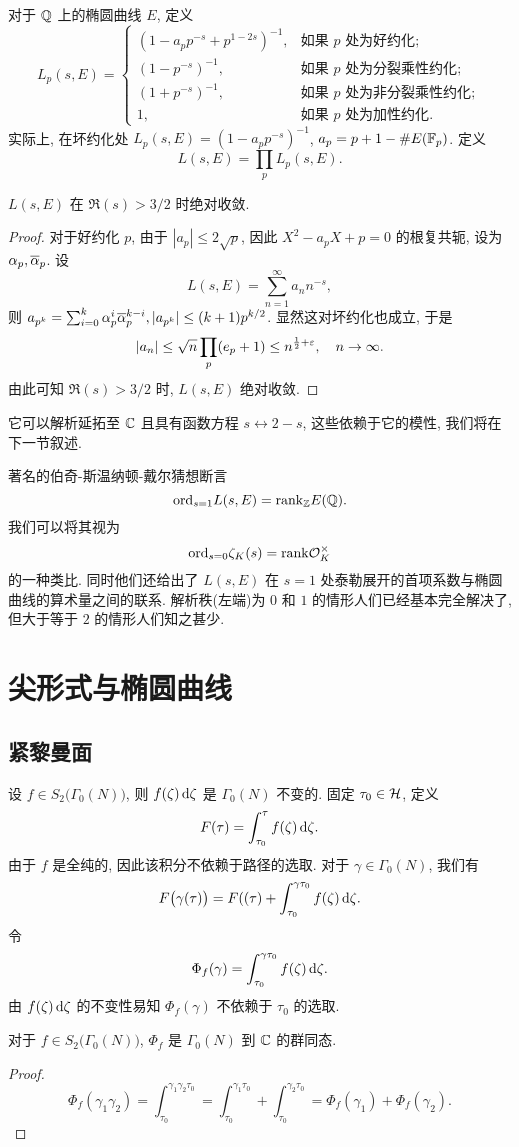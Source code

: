 对于 ${\mathbb{Q}}$ 上的椭圆曲线 $E$, 定义
  \[L_p(s,E)=\begin{cases}
    (1-a_p p^{-s}+p^{1-2s})^{-1}, & \text{如果 $p$ 处为好约化};\\
    (1-p^{-s})^{-1},              & \text{如果 $p$ 处为分裂乘性约化};\\
    (1+p^{-s})^{-1},              & \text{如果 $p$ 处为非分裂乘性约化};\\
    1,                            & \text{如果 $p$ 处为加性约化}.
  \end{cases}\]
实际上, 在坏约化处 $L_p(s,E)=(1-a_p p^{-s})^{-1}$, $a_p=p+1-\#E({\mathbb{F}}_p)$.
定义
  \[L(s,E)=\prod_{p} L_p(s,E).\]
\begin{proposition}{}{}
$L(s,E)$ 在 $\Re(s)>3/2$ 时绝对收敛.
\end{proposition}
\begin{proof}
对于好约化 $p$, 由于 $|a_p|\le 2\sqrt{p}$, 因此 $X^2-a_pX+p=0$ 的根复共轭, 设为 $\alpha_p,\overline \alpha_p$. 设
  \[L(s,E)=\sum_{n=1}^\infty a_n n^{-s},\]
则 $a_{p^k}=\sum_{i=0}^k \alpha_p^i\overline\alpha_p^{k-i}, |a_{p^k}|\le (k+1)p^{k/2}$. 显然这对坏约化也成立, 于是
  \[|a_n|\le \sqrt{n}\prod_p(e_p+1)\le n^{\frac{1}{2}+\varepsilon},\quad n\to \infty.\]
由此可知 $\Re(s)>3/2$ 时, $L(s,E)$ 绝对收敛.
\end{proof}

它可以解析延拓至 ${\mathbb{C}}$ 且具有函数方程 $s\leftrightarrow 2-s$, 这些依赖于它的模性, 我们将在下一节叙述.

著名的伯奇-斯温纳顿-戴尔猜想断言
  \[{\mathrm{ord}}_{s=1} L(s,E)={\mathrm{rank}}_{\mathbb{Z}} E({\mathbb{Q}}).\]
我们可以将其视为
  \[{\mathrm{ord}}_{s=0}\zeta_K(s)={\mathrm{rank}} {\mathcal{O}}_K^\times\]
的一种类比. 同时他们还给出了 $L(s,E)$ 在 $s=1$ 处泰勒展开的首项系数与椭圆曲线的算术量之间的联系. 解析秩(左端)为 $0$ 和 $1$ 的情形人们已经基本完全解决了, 但大于等于 $2$ 的情形人们知之甚少.


\section{尖形式与椭圆曲线}

\subsection{紧黎曼面}
设 $f\in S_2\bigl(\Gamma_0(N)\bigr)$, 则 $f(\zeta)\mathop{}\!\mathrm{d}\zeta$ 是 $\Gamma_0(N)$ 不变的. 固定 $\tau_0\in{\mathcal{H}}$, 定义
  \[F(\tau)=\int_{\tau_0}^\tau f(\zeta)\mathop{}\!\mathrm{d}\zeta.\]
由于 $f$ 是全纯的, 因此该积分不依赖于路径的选取. 对于 $\gamma\in \Gamma_0(N)$, 我们有
  \[F\bigl(\gamma(\tau)\bigr)=F((\tau)+\int_{\tau_0}^{\gamma\tau_0}f(\zeta)\mathop{}\!\mathrm{d}\zeta.\]
令
  \[\Phi_f(\gamma)=\int_{\tau_0}^{\gamma\tau_0}f(\zeta)\mathop{}\!\mathrm{d}\zeta.\]
由 $f(\zeta)\mathop{}\!\mathrm{d}\zeta$ 的不变性易知 $\Phi_f(\gamma)$ 不依赖于 $\tau_0$ 的选取.
\begin{proposition}{}{}
对于 $f\in S_2\bigl(\Gamma_0(N)\bigr)$, $\Phi_f$ 是 $\Gamma_0(N)$ 到 ${\mathbb{C}}$ 的群同态.
\end{proposition}
\begin{proof}
  \[\Phi_f(\gamma_1\gamma_2)=\int_{\tau_0}^{\gamma_1\gamma_2\tau_0}=\int _{\tau_0}^{\gamma_1\tau_0}+\int_{\tau_0}^{\gamma_2\tau_0}=\Phi_f(\gamma_1)+\Phi_f(\gamma_2).\]
\end{proof}


